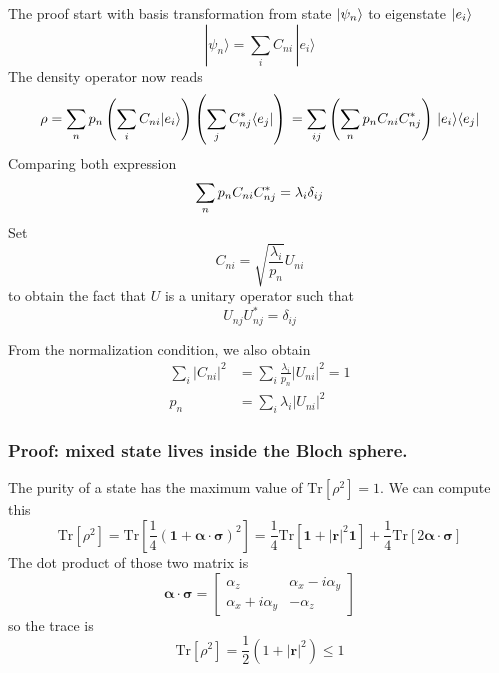 \documentclass[../../../main.tex]{subfiles}
\begin{document}
The proof start with basis transformation from state $\ket{\psi_n}$ to eigenstate $\ket{e_i}$
\begin{equation*}
  |\psi_n\rangle = \sum_i C_{ni}\,|e_i\rangle
\end{equation*}
The density operator now reads
\begin{equation*}
  \rho = \sum_n p_n\left(\sum_i C_{ni}|e_i\rangle\right)\left(\sum_j C^*_{nj}\langle e_j|\right)  \\
  = \sum_{ij}\left(\sum_n p_n C_{ni} C^*_{nj}\right)\,|e_i\rangle\langle e_j|
\end{equation*}
Comparing both expression
\begin{equation*}
  \sum_n p_n C_{ni} C_{nj}^* = \lambda_i \delta_{ij} \\
\end{equation*}
Set
\begin{equation*}
  C_{ni} = \sqrt{\frac{\lambda_i}{p_n}} U_{ni}
\end{equation*}
to obtain the fact that $U$ is a unitary operator such that
\begin{equation*}
  U_{nj }U_{nj } ^* = \delta_{ij}
\end{equation*}

From the normalization condition, we also obtain
\begin{align*}
  \sum_i |C_{ni}|^2 & =  \sum_i \frac{\lambda_i}{p_n}|U_{ni}|^2 =1 \\
  p_n               & = \sum_i \lambda_i|U_{ni}|^2
\end{align*}

\subsubsection{Proof: mixed state lives inside the Bloch sphere.}
The purity of a state has the maximum value of $\mathrm{Tr} [\rho^2]=1$.
We can compute this
\begin{equation*}
  \mathrm{Tr} [\rho^2   ]= \mathrm{Tr} \left[ \frac{1 }{4 }(\mathbf{1 }+\boldsymbol{\alpha }\cdot \boldsymbol{\sigma})^2 \right] = \frac{1 }{4} \mathrm{Tr} [\mathbf{1}+|\mathbf{r}|^2\mathbf{1}]+\frac{1 }{4 }\mathrm{Tr} [2 \boldsymbol{\alpha } \cdot \boldsymbol{\sigma} ]
\end{equation*}
The dot product of those two matrix is
\begin{equation*}
  \boldsymbol{\alpha }\cdot \boldsymbol{\sigma } =
  \begin{bmatrix}
    \alpha_z           & \alpha_x-i \alpha_y \\
    \alpha_x+i\alpha_y & -\alpha_z
  \end{bmatrix}
\end{equation*}
so the trace is
\begin{equation*}
  \mathrm{Tr} [\rho^2] = \frac{1 }{2 }(1+|\mathbf{r}|^2) \leq1
\end{equation*}
\end{document}
